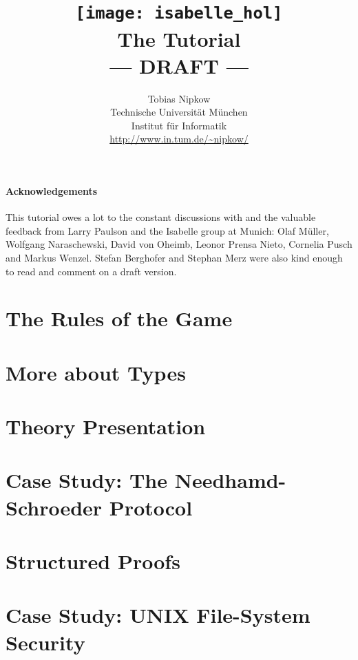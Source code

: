 \documentclass[11pt,a4paper]{report}
\begin{document}
\title{\texttt{[image: isabelle\_hol]}
       \\ \vspace{0.5cm} The Tutorial
       \\ --- DRAFT ---}
\author{Tobias Nipkow\\
Technische Universit{\"a}t M{\"u}nchen \\
Institut f{\"u}r Informatik \\
\url{http://www.in.tum.de/~nipkow/}}
\maketitle

\tableofcontents

\subsubsection*{Acknowledgements}
This tutorial owes a lot to the constant discussions with and the valuable
feedback from Larry Paulson and the Isabelle group at Munich: Olaf M{\"u}ller,
Wolfgang Naraschewski, David von Oheimb, Leonor Prensa Nieto, Cornelia Pusch
and Markus Wenzel. Stefan Berghofer and Stephan Merz were also kind enough to
read and comment on a draft version.
\clearfirst



\chapter{The Rules of the Game}



\chapter{More about Types}
\chapter{Theory Presentation}
\chapter{Case Study: The Needhamd-Schroeder Protocol}
\chapter{Structured Proofs}
\chapter{Case Study: UNIX File-System Security}




\printindex
\end{document}
